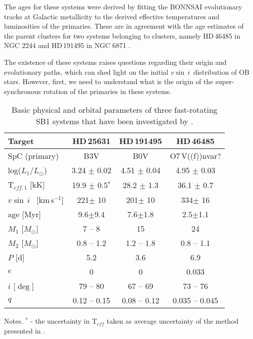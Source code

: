 \documentclass{aa}
\newcommand{\kms}{$\mathrm{km\,s^{-1}}$}
\newcommand{\vsini} {$v\sin\,i$}
\begin{document}
The ages for these systems were
derived by fitting the BONNSAI evolutionary tracks \citep{Bonnsai_2014} at Galactic
metallicity to the derived effective temperatures and luminosities of
the primaries. These are in agreement with the age estimates of the
parent clusters for two systems belonging to clusters, namely
HD\,46485 in NGC 2244 and HD\,191495 in NGC 6871 \citep[see for details][]{Naze_2023_rot}.

The existence of these systems raises questions regarding
their origin and evolutionary paths, which can shed light on the initial
\vsini~distribution of OB stars. However, first, we need to understand what is the origin of the super-synchronous rotation of the primaries in these systems.


\begin{table}[!htbp]
{\small
\caption{Basic physical and orbital parameters of three
  fast-rotating SB1 systems that have been investigated by
  \citet{Naze_2023_rot}. }
\label{table:sb1_fast}
\begin{tabular}{l c c c}
\hline
\hline
Target                  & HD\,25631          &  HD\,191495      & HD\,46485 \\
\hline
SpC (primary)             &  B3V             &  B0V             &  O7\,V((f))nvar?  \\
log($L_{1}/L_{\odot}$)    &  3.24 $\pm$ 0.02 & 4.51 $\pm$ 0.04  & 4.95 $\pm$ 0.03 \\
T$_{eff,1}$ [kK]          & 19.9 $\pm$ 0.5$^{\ast}$  & 28.2 $\pm$ 1.3   & 36.1 $\pm$ 0.7  \\
\vsini~ [\kms]            &  221$\pm$ 10 &  201$\pm$ 10  & 334$\pm$ 16  \\
\hline
age  [Myr]       &  9.6$\pm$9.4  &  7.6$\pm$1.8  & 2.5$\pm$1.1   \\
$M_\mathrm{1}$   [$M_{\odot}$]  &  7 -- 8  &  15    & 24  \\
$M_\mathrm{2}$   [$M_{\odot}$] &  0.8 -- 1.2 & 1.2 -- 1.8 &  0.8 -- 1.1 \\
$P$  [d]  &  5.2  & 3.6   &  6.9 \\
$e$       & 0   &  0  &  0.033 \\
$i$ [$\deg$]  &  79 -- 80  &  67 -- 69  &  73 -- 76 \\
$q$ & 0.12 -- 0.15 & 0.08 -- 0.12 & 0.035 -- 0.045 \\
\hline
\end{tabular}
Notes. $^{\ast}$ - the uncertainty in T$_{eff}$ taken as average uncertainty of the method presented in \citet{Braganca_2012}.
}
\end{table}
\end{document}
